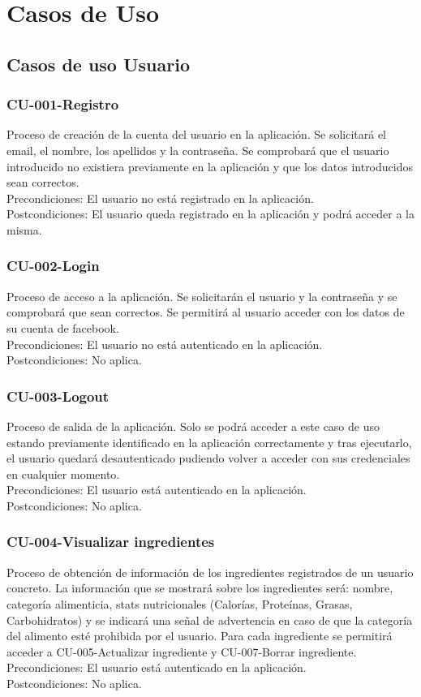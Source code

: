 \documentclass[12pt, a4paper, twoside]{book}
\begin{document}
	\section{Casos de Uso}
	\subsection{Casos de uso Usuario}
	\subsubsection{CU-001-Registro}
	Proceso de creación de la cuenta del usuario en la aplicación. Se solicitará el email, el nombre, los apellidos y la contraseña.
	Se comprobará que el usuario introducido no existiera previamente en la aplicación y que los datos introducidos sean correctos.\\
	Precondiciones: El usuario no está registrado en la aplicación.\\
	Postcondiciones: El usuario queda registrado en la aplicación y podrá acceder a la misma.
	\subsubsection{CU-002-Login}
	Proceso de acceso a la aplicación. Se solicitarán el usuario y la contraseña y se comprobará que sean correctos. Se permitirá al usuario acceder con los datos de su cuenta de facebook.\\ 	
	Precondiciones: El usuario no está autenticado en la aplicación.\\
	Postcondiciones: No aplica.
	\subsubsection{CU-003-Logout}
	Proceso de salida de la aplicación. Solo se podrá acceder a este caso de uso estando previamente identificado en la aplicación correctamente y tras ejecutarlo, el usuario quedará desautenticado pudiendo volver a acceder con sus credenciales en cualquier momento.\\
	Precondiciones: El usuario está autenticado en la aplicación.\\
	Postcondiciones: No aplica.
	\subsubsection{CU-004-Visualizar ingredientes}
	Proceso de obtención de información de los ingredientes registrados de un usuario concreto. La información que se mostrará sobre los ingredientes será: nombre, categoría alimenticia, stats nutricionales (Calorías, Proteínas, Grasas, Carbohidratos) y se indicará una señal de advertencia en caso de que la categoría del alimento esté prohibida por el usuario.
	Para cada ingrediente se permitirá acceder a CU-005-Actualizar ingrediente y CU-007-Borrar ingrediente.\\
	Precondiciones: El usuario está autenticado en la aplicación.\\
	Postcondiciones: No aplica.
\end{document}
